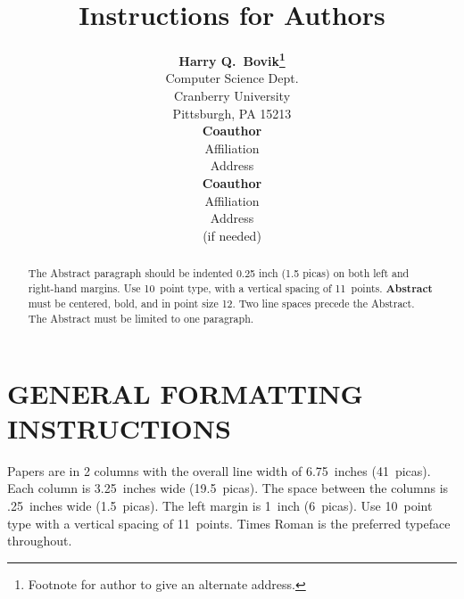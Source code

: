 

\title{Instructions for Authors} 


%
\author{ {\bf Harry Q.~Bovik\thanks{Footnote for author to give an 
alternate address.}} \\  
Computer Science Dept. \\  
Cranberry University\\ 
Pittsburgh, PA 15213 \\ 
\And 
{\bf Coauthor}  \\ 
Affiliation          \\ 
Address \\              
\And 
{\bf Coauthor}   \\ 
Affiliation \\          
Address    \\           
(if needed)\\ 
} 
 
 
 
\maketitle 
 
\begin{abstract} 
The Abstract paragraph should be indented 0.25 inch (1.5 picas) on
both left and right-hand margins.  Use 10~point type, with a vertical
spacing of 11~points.  {\bf Abstract} must be centered, bold, and in
point size 12. Two line spaces precede the Abstract. The Abstract must
be limited to one paragraph.
\end{abstract} 
 
\section{GENERAL FORMATTING INSTRUCTIONS} 
 
Papers are in 2 columns with the overall line width of 6.75~inches
(41~picas).  Each column is 3.25~inches wide (19.5~picas).  The space
between the columns is .25~inches wide (1.5~picas).  The left margin
is 1~inch (6~picas).  Use 10~point type with a vertical spacing of
11~points.  Times Roman is the preferred typeface throughout.
 
